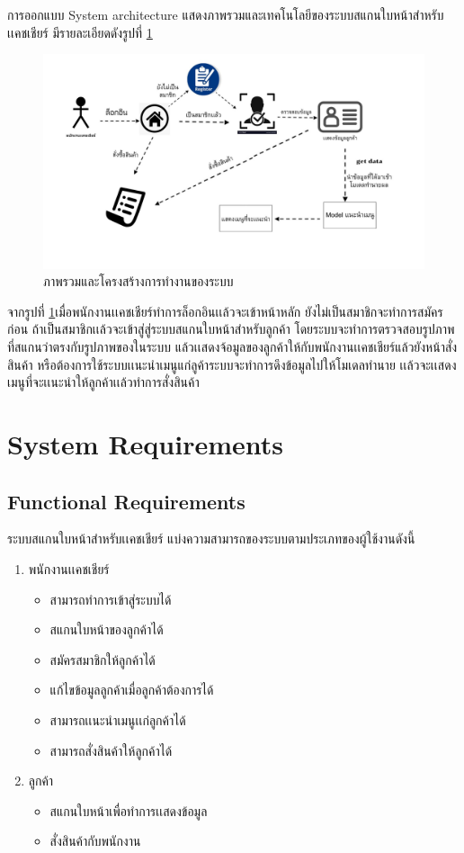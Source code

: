     การออกแบบ System architecture แสดงภาพรวมและเทคโนโลยีของระบบสแกนใบหน้าสำหรับเเคชเชียร์ มีรายละเอียดดังรูปที่ \ref{Fig:system}
   
  \begin{figure}[H]
  	\includegraphics[width=\columnwidth]{Figures/chapter3/system}
  	\caption{ภาพรวมและโครงสร้างการทำงานของระบบ}
  	\label{Fig:system} 
  \end{figure}
   
   จากรูปที่ \ref{Fig:system}เมื่อพนักงานเเคชเชียร์ทำการล็อกอินเเล้วจะเข้าหน้าหลัก ยังไม่เป็นสมาชิกจะทำการสมัครก่อน ถ้าเป็นสมาชิกเเล้วจะเข้าสู่สู่ระบบสแกนใบหน้าสำหรับลูกค้า โดยระบบจะทำการตรวจสอบรูปภาพที่สแกนว่าตรงกับรูปภาพของในระบบ แล้วเเสดงจ้อมูลของลูกค้าให้กับพนักงานเเคชเชียร์แล้วยังหน้าสั่งสินค้า หรือต้องการใช้ระบบเเนะนำเมนูแก่ลูค้าระบบจะทำการดึงข้อมูลไปให้โมเดลทำนาย เเล้วจะเเสดงเมนูที่จะเเนะนำให้ลูกค้าเเล้วทำการสั่งสินค้า
  

\section{System Requirements}
\subsection{Functional Requirements}
	ระบบสแกนใบหน้าสำหรับเเคชเชียร์ แบ่งความสามารถของระบบตามประเภทของผู้ใช้งานดังนี้
	\begin{enumerate}
		\item พนักงานเเคชเชียร์
			\begin{itemize}[label={--}]
				\item สามารถทำการเข้าสู่ระบบได้
				\item สแกนใบหน้าของลูกค้าได้
				\item สมัครสมาชิกให้ลูกค้าได้
				\item แก้ไขข้อมูลลูกค้าเมื่อลูกค้าต้องการได้
				\item สามารถเเนะนำเมนูเเก่ลูกค้าได้
				\item สามารถสั่งสินค้าให้ลูกค้าได้
				
			\end{itemize}
		\item ลูกค้า
			\begin{itemize}[label={--}]
				\item สแกนใบหน้าเพื่อทำการเเสดงข้อมูล
				\item สั่งสินค้ากับพนักงาน
			
			\end{itemize}
	\end{enumerate}


